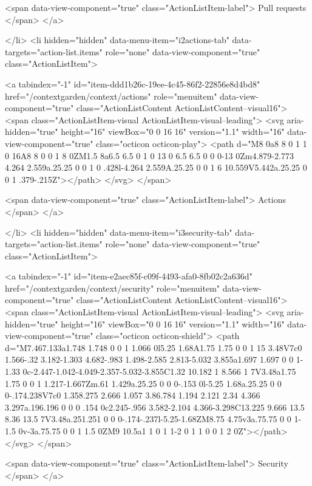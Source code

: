         <span data-view-component="true" class="ActionListItem-label">
          Pull requests
</span>      
</a>
  
</li>
        <li hidden="hidden" data-menu-item="i2actions-tab" data-targets="action-list.items" role="none" data-view-component="true" class="ActionListItem">
    
    
    <a tabindex="-1" id="item-ddd1b26c-19ee-4c45-86f2-22856e8d4bd8" href="/contextgarden/context/actions" role="menuitem" data-view-component="true" class="ActionListContent ActionListContent--visual16">
        <span class="ActionListItem-visual ActionListItem-visual--leading">
          <svg aria-hidden="true" height="16" viewBox="0 0 16 16" version="1.1" width="16" data-view-component="true" class="octicon octicon-play">
    <path d="M8 0a8 8 0 1 1 0 16A8 8 0 0 1 8 0ZM1.5 8a6.5 6.5 0 1 0 13 0 6.5 6.5 0 0 0-13 0Zm4.879-2.773 4.264 2.559a.25.25 0 0 1 0 .428l-4.264 2.559A.25.25 0 0 1 6 10.559V5.442a.25.25 0 0 1 .379-.215Z"></path>
</svg>
        </span>
      
        <span data-view-component="true" class="ActionListItem-label">
          Actions
</span>      
</a>
  
</li>
        <li hidden="hidden" data-menu-item="i3security-tab" data-targets="action-list.items" role="none" data-view-component="true" class="ActionListItem">
    
    
    <a tabindex="-1" id="item-e2aec85f-c09f-4493-afa0-8fb02c2a636d" href="/contextgarden/context/security" role="menuitem" data-view-component="true" class="ActionListContent ActionListContent--visual16">
        <span class="ActionListItem-visual ActionListItem-visual--leading">
          <svg aria-hidden="true" height="16" viewBox="0 0 16 16" version="1.1" width="16" data-view-component="true" class="octicon octicon-shield">
    <path d="M7.467.133a1.748 1.748 0 0 1 1.066 0l5.25 1.68A1.75 1.75 0 0 1 15 3.48V7c0 1.566-.32 3.182-1.303 4.682-.983 1.498-2.585 2.813-5.032 3.855a1.697 1.697 0 0 1-1.33 0c-2.447-1.042-4.049-2.357-5.032-3.855C1.32 10.182 1 8.566 1 7V3.48a1.75 1.75 0 0 1 1.217-1.667Zm.61 1.429a.25.25 0 0 0-.153 0l-5.25 1.68a.25.25 0 0 0-.174.238V7c0 1.358.275 2.666 1.057 3.86.784 1.194 2.121 2.34 4.366 3.297a.196.196 0 0 0 .154 0c2.245-.956 3.582-2.104 4.366-3.298C13.225 9.666 13.5 8.36 13.5 7V3.48a.251.251 0 0 0-.174-.237l-5.25-1.68ZM8.75 4.75v3a.75.75 0 0 1-1.5 0v-3a.75.75 0 0 1 1.5 0ZM9 10.5a1 1 0 1 1-2 0 1 1 0 0 1 2 0Z"></path>
</svg>
        </span>
      
        <span data-view-component="true" class="ActionListItem-label">
          Security
</span>      
</a>
  
